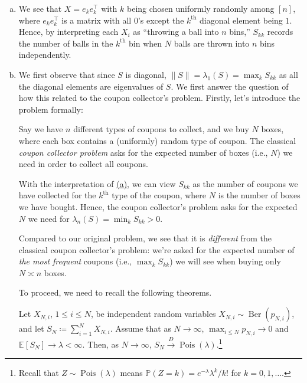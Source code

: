 \begin{answer}
	\begin{enumerate}[(a)]
		\item We see that \(X = e_k e_k ^{\top} \) with \(k\) being chosen uniformly randomly among \([n]\), where \(e_k e_k ^{\top} \) is a matrix with all \(0\)'s except the \(k^{\text{th} }\) diagonal element being \(1\). Hence, by interpreting each \(X_i\) as ``throwing a ball into \(n\) bins,'' \(S_{k k}\) records the number of balls in the \(k^{\text{th} }\) bin when \(N\) balls are thrown into \(n\) bins independently.
		\item We first observe that since \(S\) is diagonal, \(\lVert S \rVert = \lambda _1(S) = \max _k S_{k k}\) as all the diagonal elements are eigenvalues of \(S\). We first answer the question of how this related to the coupon collector's problem. Firstly, let's introduce the problem formally:

		      \begin{problem}
		      Say we have \(n\) different types of coupons to collect, and we buy \(N\) boxes, where each box contains a (uniformly) random type of coupon. The classical \emph{coupon collector problem} asks for the expected number of boxes (i.e., \(N\)) we need in order to collect all coupons.
		      \end{problem}

		      With the interpretation of \hyperref[ex5.4.14:a]{(a)}, we can view \(S_{k k}\) as the number of coupons we have collected for the \(k^{\text{th}}\) type of the coupon, where \(N\) is the number of boxes we have bought. Hence, the coupon collector's problem asks for the expected \(N\) we need for \(\lambda _n (S) = \min _{k} S_{k k} > 0\).

		      Compared to our original problem, we see that it is \emph{different} from the classical coupon collector's problem: we're asked for the expected number of \emph{the most frequent} coupons (i.e., \(\max_{k} S_{k k}\)) we will see when buying only \(N \asymp n\) boxes.

		      To proceed, we need to recall the following theorems.

		      \begin{theorem}\label{thm:Poisson-limit}
			      Let \(X_{N, i}\), \(1 \leq i \leq N\), be independent random variables \(X_{N, i} \sim \operatorname{Ber}(p_{N, i}) \), and let \(S_N \coloneqq \sum_{i=1}^{N} X_{N, i}\). Assume that as \(N \to \infty \), \(\max _{i \leq N} p_{N, i} \to 0\) and \(\mathbb{E}_{}[S_N] \to \lambda < \infty \). Then, as \(N \to \infty \), \(S_N \overset{D}{\to} \operatorname{Pois}(\lambda ) \).\footnote{Recall that \(Z \sim \operatorname{Pois}(\lambda ) \) means \(\mathbb{P} (Z = k) = e^{-\lambda } \lambda ^k / k!\) for \(k = 0, 1, \dots \).}
		      \end{theorem}


\end{enumerate}
\end{answer}
